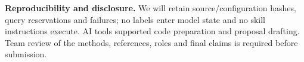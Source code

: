\documentclass{article}
\begin{document}
\noindent\textbf{Reproducibility and disclosure.}
We will retain source/configuration hashes, query reservations and failures; no
labels enter model state and no skill instructions execute. AI tools supported
code preparation and proposal drafting. Team review of the methods, references,
roles and final claims is required before submission.

\clearpage


\end{document}
